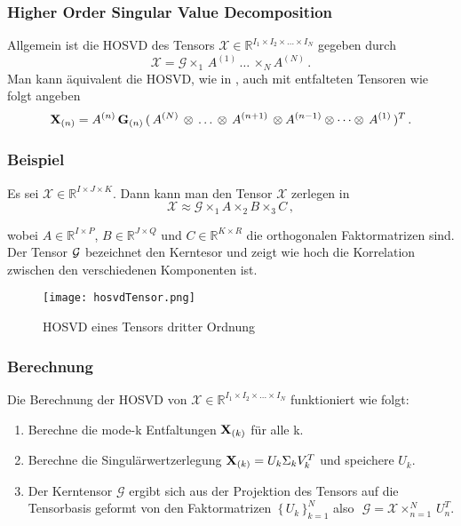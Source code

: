\begin{frame}
\frametitle{Higher Order Singular Value Decomposition}
Allgemein ist die HOSVD des Tensors $\pmb{\mathcal{X}}  \in \mathbb{R}^{I_1 \times I_2 \times \dots \times I_N}$ gegeben durch
\begin{equation*}
\pmb{\mathcal{X}}= \pmb{\mathcal{G}} \times_1 \, A^{(1)} \, \dots \, \times_N A^{(N)} \, .
\end{equation*}
Man kann äquivalent die HOSVD, wie in  \cite[462]{Kolda}, auch mit entfalteten Tensoren wie folgt angeben
\begin{equation*} \label{eq:tensortensor}
\bold{X}_{(n)} = A^{(n)} \, \bold{G}_{(n)} \, ( \, A^{(N)} \, \otimes  \, \dots \, \otimes \, A^{(n+1)} \, \otimes A^{(n-1)} \otimes \dots \otimes \, A^{(1)} \, )^{T} \, .
\end{equation*}

\end{frame}

\begin{frame}
\frametitle{Beispiel}
Es sei $\pmb{\mathcal{X}} \in \mathbb{R}^{I \times J \times K}$.  Dann kann man den Tensor $\pmb{\mathcal{X}}$ zerlegen in 
\begin{equation}
{\pmb{\mathcal{X}}} \approx  \pmb{\mathcal{G}}  \times_1 A \times_2 B \times_3 C  \, ,
\end{equation}

wobei $A \in \mathbb{R}^{I \times P}$, $B \in \mathbb{R}^{J \times Q}$ und $C \in \mathbb{R}^{K \times R}$ die orthogonalen Faktormatrizen sind.
Der Tensor ${\cal G}$ bezeichnet den Kerntesor und zeigt wie hoch die Korrelation zwischen den verschiedenen Komponenten ist.


\begin{figure}[ht]
	\centering
  \texttt{[image: hosvdTensor.png]}
	\caption{HOSVD eines Tensors dritter Ordnung \cite[475]{Kolda}}
	\label{fig:hosvdTensor}
\end{figure}
\end{frame}

\begin{frame}
\frametitle{Berechnung}
\begin{framed}
Die Berechnung der HOSVD von ${\pmb{\mathcal{X}}}  \in \mathbb{R}^{I_1 \times I_2 \times \dots \times I_N}$ funktioniert wie folgt:
\begin{enumerate}
\item Berechne die mode-k Entfaltungen $\bold{X}_{(k)}$ für alle k.
\item Berechne die Singulärwertzerlegung $\bold{X}_{(k)}=U_k \Sigma_k V_k^T$ und speichere $U_k$.
\item Der Kerntensor ${\pmb{\mathcal{G}}} $ ergibt sich aus der Projektion des Tensors auf die Tensorbasis geformt von den Faktormatrizen  $ \, \{ \, U_k \, \}_{k=1}^{N}$  also $\, \, {\pmb{\mathcal{G}}} ={\pmb{\mathcal{X}}}  \times_{n=1}^{N} \, U_n^T$.
\end{enumerate}
\end{framed}
\end{frame}


